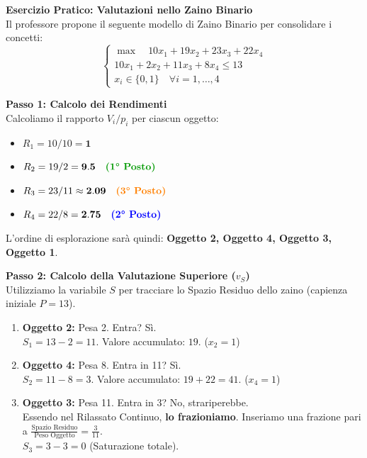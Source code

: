 \documentclass[12pt, a4paper]{article}
\newcommand{\separatore}{\noindent{\color{titlecolor!50}\rule{\textwidth}{0.6pt}}}
\begin{document}
	\vspace{0.6cm}
	\separatore
	\vspace{0.4cm}
	
	\textbf{Esercizio Pratico: Valutazioni nello Zaino Binario}\\
	Il professore propone il seguente modello di Zaino Binario per consolidare i concetti:
	\[
	\begin{cases}
		\max \quad 10x_1 + 19x_2 + 23x_3 + 22x_4 \\[6pt]
		10x_1 + 2x_2 + 11x_3 + 8x_4 \leq 13 \\[6pt]
		x_i \in \{0, 1\} \quad \forall i=1,\dots,4
	\end{cases}
	\]
	
	\textbf{Passo 1: Calcolo dei Rendimenti}\\
	Calcoliamo il rapporto $V_i / p_i$ per ciascun oggetto:
	\begin{itemize}[label=$\circ$, itemsep=2pt, leftmargin=1.5cm]
		\item $R_1 = 10 / 10 = \mathbf{1}$
		\item $R_2 = 19 / 2 = \mathbf{9.5} \quad \text{\textcolor{green!60!black}{\textbf{(1° Posto)}}}$
		\item $R_3 = 23 / 11 \approx \mathbf{2.09} \quad \text{\textcolor{orange}{\textbf{(3° Posto)}}}$
		\item $R_4 = 22 / 8 = \mathbf{2.75} \quad \text{\textcolor{blue}{\textbf{(2° Posto)}}}$
	\end{itemize}
	L'ordine di esplorazione sarà quindi: \textbf{Oggetto 2, Oggetto 4, Oggetto 3, Oggetto 1}.
	
	\vspace{0.4cm}
	\textbf{Passo 2: Calcolo della Valutazione Superiore ($v_S$)}\\
	Utilizziamo la variabile $S$ per tracciare lo Spazio Residuo dello zaino (capienza iniziale $P=13$).
	\begin{enumerate}
		\item \textbf{Oggetto 2:} Pesa 2. Entra? Sì. \\
		$S_1 = 13 - 2 = 11$. Valore accumulato: $19$. ($x_2 = 1$)
		\item \textbf{Oggetto 4:} Pesa 8. Entra in 11? Sì. \\
		$S_2 = 11 - 8 = 3$. Valore accumulato: $19 + 22 = 41$. ($x_4 = 1$)
		\item \textbf{Oggetto 3:} Pesa 11. Entra in 3? No, strariperebbe. \\
		Essendo nel Rilassato Continuo, \textbf{lo frazioniamo}. Inseriamo una frazione pari a $\frac{\text{Spazio Residuo}}{\text{Peso Oggetto}} = \frac{3}{11}$. \\
		$S_3 = 3 - 3 = 0$ (Saturazione totale).
	\end{enumerate}
	
\end{document}
